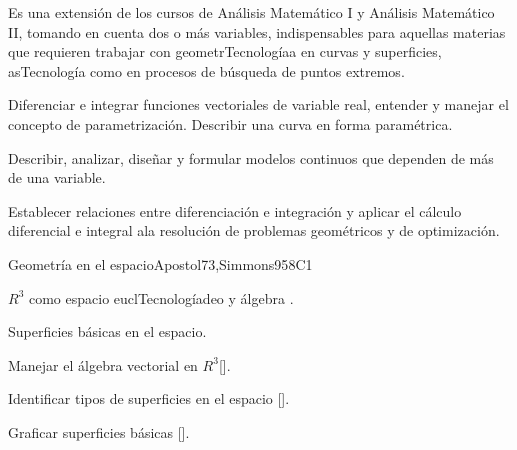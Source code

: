 \begin{syllabus}


\begin{justification}
Es una extensión de los cursos de Análisis Matemático I y Análisis Matemático II, tomando en cuenta dos o más variables, indispensables para aquellas materias que requieren trabajar con geometrTecnologíaa en curvas y superficies, asTecnología como en procesos de búsqueda de puntos extremos.
\end{justification}

\begin{goals}
\item Diferenciar e integrar funciones vectoriales de variable real, entender y manejar el concepto de parametrización. Describir una curva en forma paramétrica.
\item Describir, analizar, diseñar y formular modelos continuos que dependen de más de una variable.
\item Establecer relaciones entre diferenciación e integración y aplicar el cálculo diferencial e integral ala resolución de problemas geométricos y de optimización.
\end{goals}

\begin{outcomes}
    \item {}
    \item {}
\end{outcomes}

\begin{competences}
    \item {} 
    \item {} 
    \item {}
\end{competences}

\begin{unit}{}{Geometría en el espacio}{Apostol73,Simmons95}{8}{C1}
   \begin{topics}
      \item $R^3$ como espacio euclTecnologíadeo y álgebra .
      \item Superficies básicas en el espacio.
   \end{topics}
   \begin{learningoutcomes}
      \item Manejar el álgebra vectorial en $R^3$[\Usage].
      \item Identificar tipos de superficies en el espacio [\Usage].
      \item Graficar superficies básicas [\Usage].
      \end{learningoutcomes}
\end{unit}


\end{syllabus}
